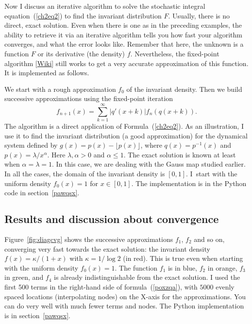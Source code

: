 \documentclass[oneside,10pt]{book}
\begin{document}
Now I discuss an iterative algorithm to solve the
\textcolor{index}{stochastic integral equation}~(\ref{ch2eq2}) to find the invariant distribution $F$. Usually, there is no direct, exact solution. Even when there is one as in the preceding examples, the ability to retrieve it via an iterative algorithm tells you how fast your algorithm converges, and what the error looks like. Remember that here, the unknown is a function $F$ or its derivative (the density) $f$. Nevertheless, the
\textcolor{index}{fixed-point algorithm} [\href{https://en.wikipedia.org/wiki/Fixed-point_iteration}{Wiki}]
still works to get a very accurate approximation of this function. It is implemented as follows.

We start with a rough approximation $f_0$ of the invariant density. Then we build successive approximations using the fixed-point iteration
\begin{equation}
f_{n+1}(x) = \sum_{k=1}^\infty |q'(x+k)| f_n(q(x+k)).\label{poxzqa}
\end{equation}
The algorithm is a direct application of Formula~(\ref{ch2eq2}). As an illustration, I use it to find the invariant distribution (a good approximation) for the dynamical system
defined by $g(x)=p(x)-\lfloor p(x)\rfloor$, where $q(x)=p^{-1}(x)$ and $p(x) = \lambda / x^\alpha$. Here $\lambda,\alpha>0$
 and $\alpha\leq 1$. The
 exact solution is known at least when $\alpha=\lambda=1$. In this case, we are dealing with the Gauss map studied earlier. In all the cases,
 the domain of the invariant density is $[0, 1]$. I~start with the uniform density $f_0(x) = 1$ for $x\in [0, 1]$. The implementation is in the
Python code in section~\ref{pawqsx}.

\subsection{Results and discussion about convergence}

Figure~\ref{fig:diagcvg} shows the successive approximations $f_1$, $f_2$ and so on, converging very fast towards the exact solution: the
 invariant density $f(x) = \kappa/(1+x)$ with $\kappa = 1/\log 2$ (in red). This is true even when starting with the uniform density $f_0(x) = 1$.
 The function $f_1$ is in blue, $f_2$  in orange, $f_3$ in green, and $f_4$ is already indistinguishable from the exact solution. I used
 the first 500 terms in the right-hand side of formula~(\ref{poxzqa}), with $\num{5000}$ evenly spaced locations (interpolating nodes) on the X-axis for the
 approximations. You can do very well with much fewer terms and nodes. The Python implementation is in section~\ref{pawqsx}.
\end{document}
